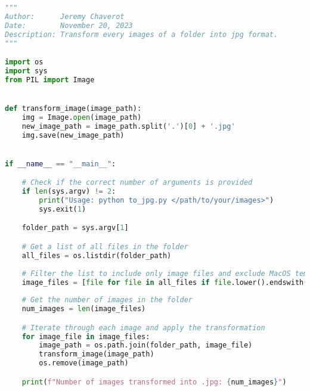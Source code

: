 \begin{lstlisting}[language=Python, label=lst:2, caption=Python script \texttt{to\_jpg.py} to transform every images of a specified folder into \texttt{jpg} format.]
"""
Author:      Jeremy Chaverot
Date:        November 20, 2023
Description: Transform every images of a folder into jpg format.
"""

import os
import sys
from PIL import Image


def transform_image(image_path):
    img = Image.open(image_path)
    new_image_path = image_path.split('.')[0] + '.jpg'
    img.save(new_image_path)


if __name__ == "__main__":

	# Check if the correct number of arguments is provided
    if len(sys.argv) != 2:
        print("Usage: python to_jpg.py </path/to/your/images>")
        sys.exit(1)

    folder_path = sys.argv[1]

    # Get a list of all files in the folder
    all_files = os.listdir(folder_path)
    
    # Filter the list to include only image files and exclude MacOS temporary files
    image_files = [file for file in all_files if file.lower().endswith(('.png', '.jpg', '.jpeg', '.gif', '.bmp')) and not file.startswith('._')]
    
    # Get the number of images in the folder
    num_images = len(image_files)

    # Iterate through each image and apply the transformation
    for image_file in image_files:
        image_path = os.path.join(folder_path, image_file)
        transform_image(image_path)
        os.remove(image_path)

    print(f"Number of images transformed into .jpg: {num_images}")
\end{lstlisting}


\bigskip


